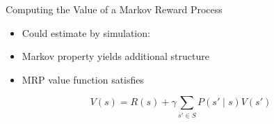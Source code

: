 \begin{frame}[c]{Computing the Value of a Markov Reward Process}
	
	\begin{itemize}
		\item Could estimate by simulation:
		\item Markov property yields additional structure
		\item MRP value function satisfies
	\end{itemize}

$$V(s) = R(s) + \gamma \sum_{s' \in S} P(s'\mid s) V(s')$$
	
\end{frame}




